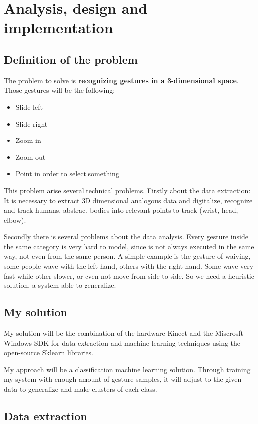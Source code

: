 
\chapter{Analysis, design and implementation}


\section{Definition of the problem}

The problem to solve is \textbf{recognizing gestures in a 3-dimensional space}.
Those gestures will be the following:

\begin{itemize}
\item Slide left 
\item Slide right
\item Zoom in 
\item Zoom out
\item Point in order to select something
\end{itemize}

This problem arise several technical problems. Firstly about the data extraction: It is necessary to extract 3D dimensional analogous data and digitalize, recognize and track humans, abstract bodies into relevant points to track (wrist, head, elbow). 

Secondly there is several problems about the data analysis. Every gesture inside the same category is very hard to model, since is not always executed in the same way, not even from the same person. A simple example is the gesture of waiving, some people wave with the left hand, others with the right hand. Some wave very fast while other slower, or even not move from side to side. So we need a heuristic solution, a system able to generalize.

\section{My solution}

My solution will be the combination of the hardware Kinect and the Miscrosft Windows SDK for data extraction and machine learning techniques using the open-source Sklearn libraries. 


My approach will be a classification machine learning solution. Through training my system with enough amount of gesture samples, it will adjust to the given data to generalize and make clusters of each class. 

\section{Data extraction}

